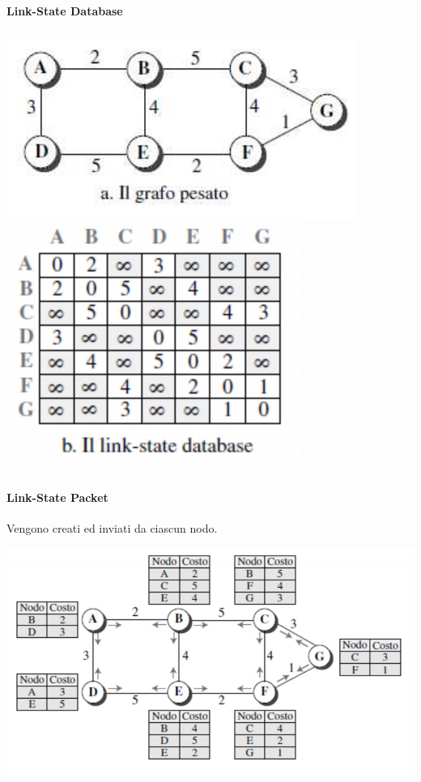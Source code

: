 \documentclass[10pt]{article}
\begin{document}
\paragraph{Link-State Database}
\begin{center}
	\begin{multicols}{2}
		\includegraphics[scale=0.7]{linkstategraph.png}\\
		\includegraphics[scale=0.7]{linkstatedatabase.png}
	\end{multicols}
\end{center}
\paragraph{Link-State Packet} Vengono creati ed inviati da ciascun nodo.
\begin{center}
	\includegraphics[scale=0.7]{linkstatepacket.png}
\end{center}
\end{document}

